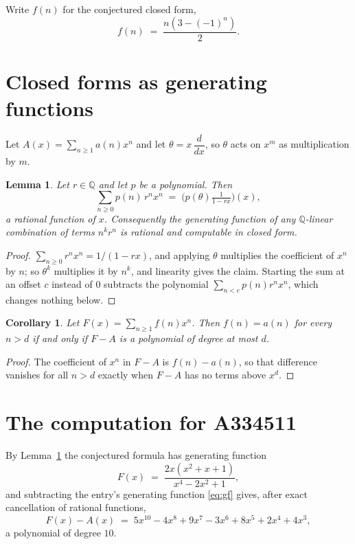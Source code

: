\documentclass[11pt,a4paper]{article}
\theoremstyle{plain}
\newtheorem{lemma}[theorem]{Lemma}
\newtheorem{corollary}[theorem]{Corollary}
\theoremstyle{definition}
\begin{document}
Write $f(n)$ for the conjectured closed form,
\[
f(n)\;=\;\frac{n \left(3 - \left(-1\right)^{n}\right)}{2} .
\]

\section{Closed forms as generating functions}

Let $A(x)=\sum_{n\ge 1}a(n)x^{n}$ and let $\theta=x\,\dfrac{d}{dx}$, so $\theta$
acts on $x^{m}$ as multiplication by $m$.

\begin{lemma}\label{lem:gf}
Let $r\in\mathbb{Q}$ and let $p$ be a polynomial. Then
\[
\sum_{n\ge0}p(n)\,r^{n}x^{n}\;=\;\bigl(p(\theta)\tfrac{1}{1-rx}\bigr)(x),
\]
a rational function of $x$. Consequently the generating function of any
$\mathbb{Q}$-linear combination of terms $n^{k}r^{n}$ is rational and computable in
closed form.
\end{lemma}

\begin{proof}
$\sum_{n\ge0}r^{n}x^{n}=1/(1-rx)$, and applying $\theta$ multiplies the coefficient of
$x^{n}$ by $n$; so $\theta^{k}$ multiplies it by $n^{k}$, and linearity gives the claim.
Starting the sum at an offset $c$ instead of $0$ subtracts the polynomial
$\sum_{n<c}p(n)r^{n}x^{n}$, which changes nothing below.
\end{proof}

\begin{corollary}\label{cor:criterion}
Let $F(x)=\sum_{n\ge 1}f(n)x^{n}$. Then $f(n)=a(n)$ for every $n>d$ if and only
if $F-A$ is a polynomial of degree at most $d$.
\end{corollary}

\begin{proof}
The coefficient of $x^{n}$ in $F-A$ is $f(n)-a(n)$, so that difference vanishes for all
$n>d$ exactly when $F-A$ has no terms above $x^{d}$.
\end{proof}

\section{The computation for A334511}

By Lemma~\ref{lem:gf} the conjectured formula has generating function
\[
F(x)\;=\;\frac{2 x \left(x^{2} + x + 1\right)}{x^{4} - 2 x^{2} + 1} ,
\]
and subtracting the entry's generating function \eqref{eq:gf} gives, after exact
cancellation of rational functions,
\[
F(x)-A(x)\;=\;5 x^{10} - 4 x^{8} + 9 x^{7} - 3 x^{6} + 8 x^{5} + 2 x^{4} + 4 x^{3} ,
\]
a polynomial of degree $10$.
\end{document}

